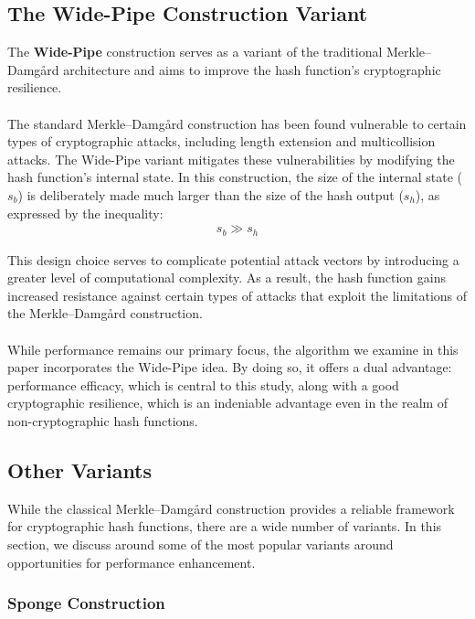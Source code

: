 \documentclass[10pt]{article}
\begin{document}
\subsection{The Wide-Pipe Construction Variant} \label{widepipe}

The \textbf{Wide-Pipe} construction serves as a variant of the traditional Merkle–Damgård architecture and aims to improve the hash
function's cryptographic resilience.\\\\
The standard Merkle–Damgård construction has been found vulnerable to certain types of cryptographic attacks, including length extension
and multicollision attacks. The Wide-Pipe variant mitigates these vulnerabilities by modifying the hash function's internal state.
In this construction, the size of the internal state (\(s_b\)) is deliberately made much larger than the size of the hash output
(\(s_h\)), as expressed by the inequality:
\begin{align*}
    s_b \gg s_h
\end{align*}

This design choice serves to complicate potential attack vectors by introducing a greater level of computational complexity.
As a result, the hash function gains increased resistance against certain types of attacks that exploit the limitations of the
Merkle–Damgård construction.\\\\
While performance remains our primary focus, the algorithm we examine in this paper incorporates the Wide-Pipe idea. By doing so,
it offers a dual advantage: performance efficacy, which is central to this study, along with a good cryptographic resilience,
which is an indeniable advantage even in the realm of non-cryptographic hash functions.

\subsection{Other Variants}

While the classical Merkle–Damgård construction provides a reliable framework for cryptographic hash functions,
there are a wide number of variants\cite{merkle_damgard_alternatives_review}. In this section, we discuss around some
of the most popular variants around opportunities for performance enhancement.

\subsubsection{Sponge Construction}
\end{document}
